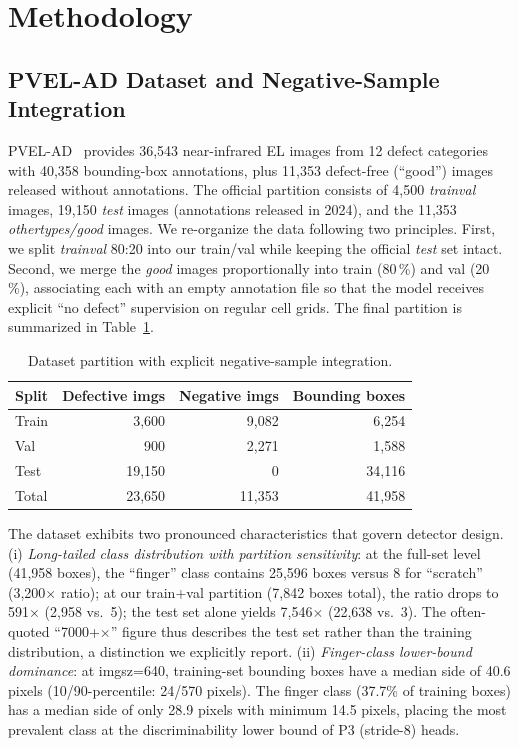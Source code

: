 \documentclass[journal,onecolumn,11pt]{IEEEtran}
\begin{document}
\section{Methodology}
\label{sec:method}

\subsection{PVEL-AD Dataset and Negative-Sample Integration}
\label{sec:dataset}
PVEL-AD~\cite{su2023pvelad} provides 36{,}543 near-infrared EL images from 12 defect categories with 40{,}358 bounding-box annotations, plus 11{,}353 defect-free (``good'') images released without annotations. The official partition consists of 4{,}500 \emph{trainval} images, 19{,}150 \emph{test} images (annotations released in 2024), and the 11{,}353 \emph{othertypes/good} images. We re-organize the data following two principles. First, we split \emph{trainval} 80:20 into our train/val while keeping the official \emph{test} set intact. Second, we merge the \emph{good} images proportionally into train (80\,\%) and val (20\,\%), associating each with an empty annotation file so that the model receives explicit ``no defect'' supervision on regular cell grids. The final partition is summarized in Table~\ref{tab:dataset}.

\begin{table}[!t]
\caption{Dataset partition with explicit negative-sample integration.}
\label{tab:dataset}
\centering
\renewcommand{\arraystretch}{1.2}
\begin{tabular}{@{}lrrr@{}}
\toprule
Split & Defective imgs & Negative imgs & Bounding boxes \\
\midrule
Train & 3{,}600 & 9{,}082 & 6{,}254 \\
Val   &   900 & 2{,}271 & 1{,}588 \\
Test  & 19{,}150 &     0 & 34{,}116 \\
\midrule
Total & 23{,}650 & 11{,}353 & 41{,}958 \\
\bottomrule
\end{tabular}
\end{table}

The dataset exhibits two pronounced characteristics that govern detector design. (i) \emph{Long-tailed class distribution with partition sensitivity}: at the full-set level (41{,}958 boxes), the ``finger'' class contains 25{,}596 boxes versus 8 for ``scratch'' (3{,}200$\times$ ratio); at our train+val partition (7{,}842 boxes total), the ratio drops to 591$\times$ (2{,}958 vs.\ 5); the test set alone yields 7{,}546$\times$ (22{,}638 vs.\ 3). The often-quoted ``7000+$\times$'' figure thus describes the test set rather than the training distribution, a distinction we explicitly report. (ii) \emph{Finger-class lower-bound dominance}: at imgsz=640, training-set bounding boxes have a median side of 40.6 pixels (10/90-percentile: 24/570 pixels). The finger class (37.7\% of training boxes) has a median side of only 28.9 pixels with minimum 14.5 pixels, placing the most prevalent class at the discriminability lower bound of P3 (stride-8) heads.
\end{document}

